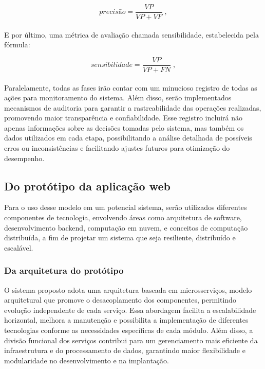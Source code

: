 \begin{equation} 
  precisão = \frac{VP}{VP + VF} \; ,
  \label{eq: precisao}
\end{equation}
 \\
E por último, uma métrica de avaliação chamada sensibilidade, estabelecida pela fórmula:

\begin{equation}
sensibilidade = \frac{VP}{VP + FN} \; ,
  \label{eq: sensibilidade}
\end{equation}
\\
Paralelamente, todas as fases irão contar com um minucioso registro de todas as ações para monitoramento do sistema. Além disso, serão implementados mecanismos de auditoria para garantir a rastreabilidade das operações realizadas, promovendo maior transparência e confiabilidade. Esse registro incluirá não apenas informações sobre as decisões tomadas pelo sistema, mas também os dados utilizados em cada etapa, possibilitando a análise detalhada de possíveis erros ou inconsistências e facilitando ajustes futuros para otimização do desempenho.

\subsection{Do protótipo da aplicação web}

Para o uso desse modelo em um potencial sistema, serão utilizados diferentes componentes de tecnologia, envolvendo áreas como arquitetura de software, desenvolvimento backend, computação em nuvem, e conceitos de computação distribuída, a fim de projetar um sistema que seja resiliente, distribuído e escalável.

\subsubsection{Da arquitetura do protótipo}
O sistema proposto adota uma arquitetura baseada em microsserviços, modelo arquitetural que promove o desacoplamento dos componentes, permitindo evolução independente de cada serviço. Essa abordagem facilita a escalabilidade horizontal, melhora a manutenção e possibilita a implementação de diferentes tecnologias conforme as necessidades específicas de cada módulo. Além disso, a divisão funcional dos serviços contribui para um gerenciamento mais eficiente da infraestrutura e do processamento de dados, garantindo maior flexibilidade e modularidade no desenvolvimento e na implantação.

